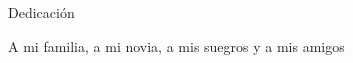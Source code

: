 \begin{dedication}
    Dedicación
\end{dedication}

A mi familia, a mi novia, a mis suegros y a mis amigos